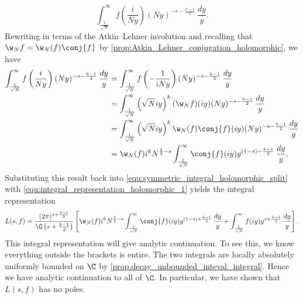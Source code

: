       \[
        \int_{\frac{1}{\sqrt{N}}}^{\infty}f\left(\frac{i}{Ny}\right)(Ny)^{-s-\frac{k-1}{2}}\,\frac{dy}{y}.
      \]
      Rewriting in terms of the Atkin–Lehner involution and recalling that $\w_{N}f = \w_{N}(f)\conj{f}$ by \cref{prop:Atkin_Lehner_conjugation_holomorphic}, we have
      \begin{align*}
        \int_{\frac{1}{\sqrt{N}}}^{\infty}f\left(\frac{i}{Ny}\right)(Ny)^{-s-\frac{k-1}{2}}\,\frac{dy}{y} &= \int_{\frac{1}{\sqrt{N}}}^{\infty}f\left(-\frac{1}{iNy}\right)(Ny)^{-s-\frac{k-1}{2}}\,\frac{dy}{y} \\
        &= \int_{\frac{1}{\sqrt{N}}}^{\infty}\left(\sqrt{N}iy\right)^{k}(\w_{N}f)(iy)(Ny)^{-s-\frac{k-1}{2}}\,\frac{dy}{y} \\
        &= \int_{\frac{1}{\sqrt{N}}}^{\infty}\left(\sqrt{N}iy\right)^{k}\w_{N}(f)\conj{f}(iy)(Ny)^{-s-\frac{k-1}{2}}\,\frac{dy}{y} \\
        &= \w_{N}(f)i^{k}N^{\frac{1}{2}-s}\int_{\frac{1}{\sqrt{N}}}^{\infty}\conj{f}(iy)y^{(1-s)-\frac{k-1}{2}}\,\frac{dy}{y}.
      \end{align*}
      Substituting this result back into \cref{equ:symmetric_integral_holomorphic_split} with \cref{equ:integral_representation_holomorphic_1} yields the integral representation
      \[
        L(s,f) = \frac{(2\pi)^{s+\frac{k-1}{2}}}{\G\left(s+\frac{k-1}{2}\right)}\left[\w_{N}(f)i^{k}N^{\frac{1}{2}-s}\int_{\frac{1}{\sqrt{N}}}^{\infty}\conj{f}(iy)y^{(1-s)+\frac{k-1}{2}}\,\frac{dy}{y}+\int_{\frac{1}{\sqrt{N}}}^{\infty}f(iy)y^{s+\frac{k-1}{2}}\,\frac{dy}{y}\right].
      \]
      This integral representation will give analytic continuation. To see this, we know everything outside the brackets is entire. The two integrals are locally absolutely uniformly bounded on $\C$ by \cref{prop:decay_unbounded_inteval_integral}. Hence we have analytic continuation to all of $\C$. In particular, we have shown that $L(s,f)$ has no poles.
